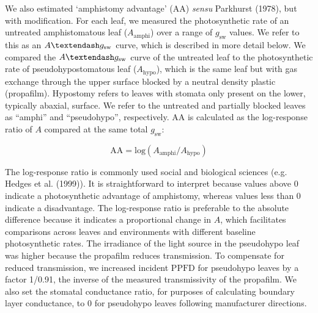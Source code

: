\documentclass[
  letterpaper,
  DIV=11,
  numbers=noendperiod]{scrartcl}
\begin{document}
We also estimated `amphistomy advantage' (\(\mathrm{AA}\)) \emph{sensu}
Parkhurst (1978), but with modification. For each leaf, we measured the
photosynthetic rate of an untreated amphistomatous leaf
(\(A_{\mathrm{amphi}}\)) over a range of \(g_\text{sw}\) values. We
refer to this as an \(A \textendash g_\text{sw}\) curve, which is
described in more detail below. We compared the
\(A \textendash g_\text{sw}\) curve of the untreated leaf to the
photosynthetic rate of pseudohypostomatous leaf (\(A_\mathrm{hypo}\)),
which is the same leaf but with gas exchange through the upper surface
blocked by a neutral density plastic (propafilm). Hypostomy refers to
leaves with stomata only present on the lower, typically abaxial,
surface. We refer to the untreated and partially blocked leaves as
``amphi'' and ``pseudohypo'', respectively. \(\mathrm{AA}\) is
calculated as the log-response ratio of \(A\) compared at the same total
\(g_\text{sw}\):

\[\mathrm{AA} = \mathrm{log}(A_{\mathrm{amphi}} / A_{\mathrm{hypo}})\]

The log-response ratio is commonly used social and biological sciences
(e.g. Hedges et al. (1999)). It is straightforward to interpret because
values above 0 indicate a photosynthetic advantage of amphistomy,
whereas values less than 0 indicate a disadvantage. The log-response
ratio is preferable to the absolute difference because it indicates a
proportional change in \(A\), which facilitates comparisons across
leaves and environments with different baseline photosynthetic rates.
The irradiance of the light source in the pseudohypo leaf was higher
because the propafilm reduces transmission. To compensate for reduced
transmission, we increased incident \(\mathrm{PPFD}\) for pseudohypo
leaves by a factor 1/0.91, the inverse of the measured transmissivity of
the propafilm. We also set the stomatal conductance ratio, for purposes
of calculating boundary layer conductance, to 0 for pseudohypo leaves
following manufacturer directions.
\end{document}
